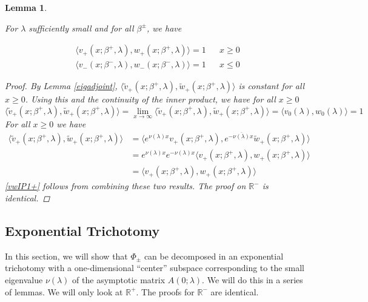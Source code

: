 \documentclass[12pt]{article}
\def\R{{\mathbb R}}
\newtheorem{lemma}{Lemma}
\begin{document}
\begin{lemma}\label{vwIP1}

For $\lambda$ sufficiently small and for all $\beta^\pm$, we have

\begin{align}
\langle v_+(x; \beta^+, \lambda), w_+(x; \beta^+, \lambda) \rangle = 1 && x \geq 0 \label{vwIP1+} \\
\langle v_-(x; \beta^-, \lambda), w_-(x; \beta^-, \lambda) \rangle = 1 && x \leq 0 \label{vwIP1-}
\end{align}

\begin{proof}
By Lemma \ref{eigadjoint}, $\langle \tilde{v}_+(x; \beta^+, \lambda), \tilde{w}_+(x; \beta^+, \lambda) \rangle$ is constant for all $x \geq 0$. Using this and the continuity of the inner product, we have for all $x \geq 0$
\begin{equation*}
\langle \tilde{v}_+(x; \beta^+, \lambda), \tilde{w}_+(x; \beta^+, \lambda) \rangle = \lim_{x \rightarrow \infty} \langle \tilde{v}_+(x; \beta^+, \lambda), \tilde{w}_+(x; \beta^+, \lambda) \rangle = \langle v_0(\lambda), w_0(\lambda) \rangle = 1
\end{equation*}
For all $x \geq 0$ we have
\begin{align*}
\langle \tilde{v}_+(x; \beta^+, \lambda), \tilde{w}_+(x; \beta^+, \lambda) \rangle
&= \langle e^{\nu(\lambda) x } v_+(x; \beta^+, \lambda), e^{-\overline{\nu(\lambda)} x} \tilde{w}_+(x; \beta^+, \lambda) \rangle \\
&= e^{\nu(\lambda) x } e^{-\nu(\lambda) x } \langle v_+(x; \beta^+, \lambda), w_+(x; \beta^+, \lambda) \rangle \\
&= \langle v_+(x; \beta^+, \lambda), w_+(x; \beta^+, \lambda) \rangle
\end{align*}
\eqref{vwIP1+} follows from combining these two results. The proof on $\R^-$ is identical.
\end{proof}
\end{lemma}

\subsection{Exponential Trichotomy}

In this section, we will show that $\Phi_\pm$ can be decomposed in an exponential trichotomy with a one-dimensional ``center'' subspace corresponding to the small eigenvalue $\nu(\lambda)$ of the asymptotic matrix $A(0; \lambda)$. We will do this in a series of lemmas. We will only look at $\R^+$. The proofs for $\R^-$ are identical.\\
\end{document}
